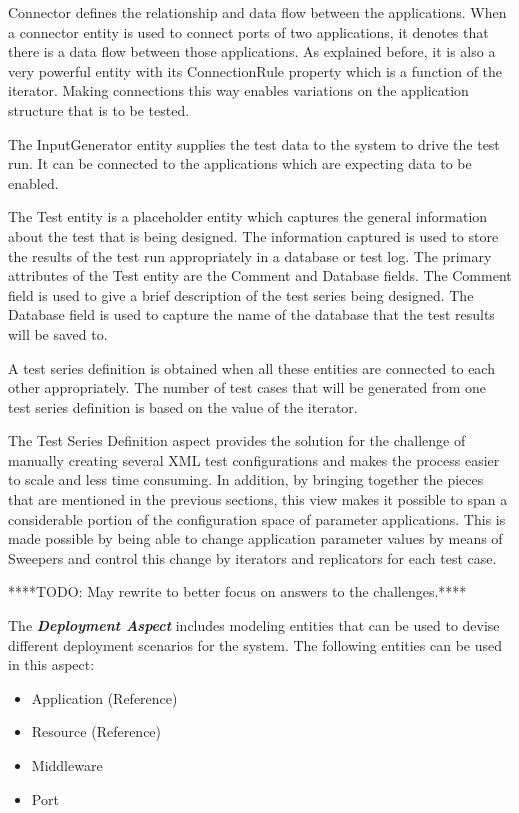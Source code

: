 Connector defines the relationship and data flow between the applications. When a connector entity is used to connect ports of two applications, it denotes that there is a data flow between those applications. As explained before, it is also a very powerful entity with its ConnectionRule property which is a function of the iterator. Making connections this way enables variations on the application structure that is to be tested.

The InputGenerator entity supplies the test data to the system to drive the test run. It can be connected to the applications which are expecting data to be enabled.

The Test entity is a placeholder entity which captures the general information about the test that is being designed. The information captured is used to store the results of the test run appropriately in a database or test log. The primary attributes of the Test entity are the Comment and Database fields. The Comment field is used to give a brief description of the test series being designed. The Database field is used to capture the name of the database that the test results will be saved to.

A test series definition is obtained when all these entities are connected to each other appropriately. The number of test cases that will be generated from one test series definition is based on the value of the iterator. 

The Test Series Definition aspect provides the solution for the challenge of manually creating several XML test configurations and makes the process easier to scale and less time consuming. In addition, by bringing together the pieces that are mentioned in the previous sections, this view makes it possible to span a considerable portion of the configuration space of parameter applications. This is made possible by being able to change application parameter values by means of Sweepers and control this change by iterators and replicators for each test case.

****TODO: May rewrite to better focus on answers to the challenges.****

The \textit{\textbf{Deployment Aspect}} includes modeling entities that can be used to devise different deployment scenarios for the system. The following entities can be used in this aspect:

\begin{itemize}
	\item Application (Reference)
	\item Resource (Reference)
	\item Middleware
	\item Port
\end{itemize}

